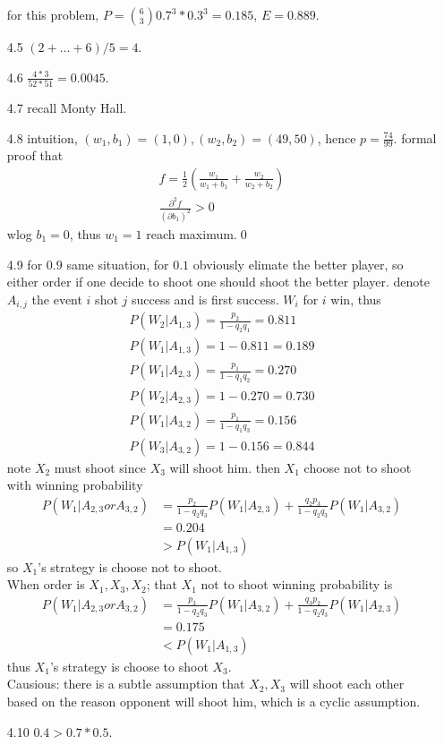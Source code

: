 \documentclass[paper=a4, fontsize=11pt]{scrartcl} %
\numberwithin{equation}{section} %
\numberwithin{figure}{section} %
\numberwithin{table}{section} %
\begin{document}
\begin{itemize}
	for this problem, $P= {6\choose 3} 0.7^3*0.3^3 = 0.185$, $E=0.889$.
	\item[4.5] $(2+\dots+6)/5= 4$.
	\item[4.6] $\frac{4*3}{52*51}= 0.0045$.
	\item[4.7] recall Monty Hall.
	\item[4.8] intuition, $(w_1,b_1)=(1,0), (w_2,b_2)=(49,50)$, hence $p=\frac{74}{99}$. formal proof that
	\begin{align}
		f = \frac{1}{2}(\frac{w_1}{w_1+b_1} + \frac{w_2}{w_2+b_2})\\
		\frac{\partial^2 f}{(\partial b_1)^2}> 0
	\end{align}
	wlog $b_1=0$, thus $w_1=1$ reach maximum.\qed
	\item[4.9] for $0.9$ same situation, for $0.1$ obviously elimate the better player, so either order if one decide to shoot one should shoot the better player. denote $A_{i,j}$ the event $i$ shot $j$ success and is first success. $W_i$ for $i$ win, thus
	\begin{align}
		P(W_2| A_{1,3}) = \frac{p_2}{1-q_2q_1} = 0.811\\
		P(W_1| A_{1,3}) = 1 -0.811= 0.189\\
		P(W_1| A_{2,3}) = \frac{p_1}{1-q_1q_2} = 0.270\\
		P(W_2| A_{2,3}) = 1 - 0.270 = 0.730\\
		P(W_1| A_{3,2}) = \frac{p_1}{1-q_1q_3} = 0.156\\
		P(W_3| A_{3,2}) = 1 - 0.156 = 0.844
	\end{align}
	note $X_2$ must shoot since $X_3$ will shoot him. then $X_1$ choose not to shoot with winning probability
	\begin{align}
		P(W_1 | A_{2,3} or A_{3,2}) &= \frac{p_2}{1-q_2q_3} P(W_1|A_{2,3}) + \frac{q_2p_3}{1-q_2q_3} P(W_1|A_{3,2}) \\
			&= 0.204\\
			&> P(W_1| A_{1,3})
	\end{align}
	so $X_1$'s strategy is choose not to shoot.\\
	When order is $X_1,X_3,X_2$; that $X_1$ not to shoot winning probability is 
	\begin{align}
		P(W_1 | A_{2,3} or A_{3,2}) &= \frac{p_3}{1-q_2q_3}P(W_1|A_{3,2}) + \frac{q_3p_2}{1-q_2q_3} P(W_1|A_{2,3}) \\
			&= 0.175\\
			&< P(W_1| A_{1,3})
	\end{align}
	thus $X_1$'s strategy is choose to shoot $X_3$.\\
	Causious: there is a subtle assumption that $X_2,X_3$ will shoot each other based on the reason opponent will shoot him, which is a cyclic assumption.
	\item[4.10] $0.4>0.7*0.5$.
\end{itemize}
\end{document}
